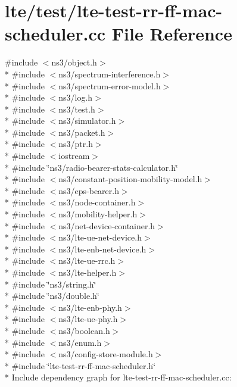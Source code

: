 \hypertarget{lte-test-rr-ff-mac-scheduler_8cc}{}\section{lte/test/lte-\/test-\/rr-\/ff-\/mac-\/scheduler.cc File Reference}
\label{lte-test-rr-ff-mac-scheduler_8cc}
{\ttfamily \#include $<$ns3/object.\+h$>$}\\*
{\ttfamily \#include $<$ns3/spectrum-\/interference.\+h$>$}\\*
{\ttfamily \#include $<$ns3/spectrum-\/error-\/model.\+h$>$}\\*
{\ttfamily \#include $<$ns3/log.\+h$>$}\\*
{\ttfamily \#include $<$ns3/test.\+h$>$}\\*
{\ttfamily \#include $<$ns3/simulator.\+h$>$}\\*
{\ttfamily \#include $<$ns3/packet.\+h$>$}\\*
{\ttfamily \#include $<$ns3/ptr.\+h$>$}\\*
{\ttfamily \#include $<$iostream$>$}\\*
{\ttfamily \#include \char`\"{}ns3/radio-\/bearer-\/stats-\/calculator.\+h\char`\"{}}\\*
{\ttfamily \#include $<$ns3/constant-\/position-\/mobility-\/model.\+h$>$}\\*
{\ttfamily \#include $<$ns3/eps-\/bearer.\+h$>$}\\*
{\ttfamily \#include $<$ns3/node-\/container.\+h$>$}\\*
{\ttfamily \#include $<$ns3/mobility-\/helper.\+h$>$}\\*
{\ttfamily \#include $<$ns3/net-\/device-\/container.\+h$>$}\\*
{\ttfamily \#include $<$ns3/lte-\/ue-\/net-\/device.\+h$>$}\\*
{\ttfamily \#include $<$ns3/lte-\/enb-\/net-\/device.\+h$>$}\\*
{\ttfamily \#include $<$ns3/lte-\/ue-\/rrc.\+h$>$}\\*
{\ttfamily \#include $<$ns3/lte-\/helper.\+h$>$}\\*
{\ttfamily \#include \char`\"{}ns3/string.\+h\char`\"{}}\\*
{\ttfamily \#include \char`\"{}ns3/double.\+h\char`\"{}}\\*
{\ttfamily \#include $<$ns3/lte-\/enb-\/phy.\+h$>$}\\*
{\ttfamily \#include $<$ns3/lte-\/ue-\/phy.\+h$>$}\\*
{\ttfamily \#include $<$ns3/boolean.\+h$>$}\\*
{\ttfamily \#include $<$ns3/enum.\+h$>$}\\*
{\ttfamily \#include $<$ns3/config-\/store-\/module.\+h$>$}\\*
{\ttfamily \#include \char`\"{}lte-\/test-\/rr-\/ff-\/mac-\/scheduler.\+h\char`\"{}}\\*
Include dependency graph for lte-\/test-\/rr-\/ff-\/mac-\/scheduler.cc\+:
